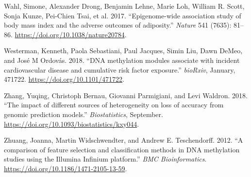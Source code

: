 \documentclass[]{article}
\begin{document}
\leavevmode\hypertarget{ref-Wahl2017}{}%
Wahl, Simone, Alexander Drong, Benjamin Lehne, Marie Loh, William R.
Scott, Sonja Kunze, Pei-Chien Tsai, et al. 2017. ``Epigenome-wide
association study of body mass index and the adverse outcomes of
adiposity.'' \emph{Nature} 541 (7635): 81--86.
\url{https://doi.org/10.1038/nature20784}.

\leavevmode\hypertarget{ref-Westerman2018}{}%
Westerman, Kenneth, Paola Sebastiani, Paul Jacques, Simin Liu, Dawn
DeMeo, and José M Ordovás. 2018. ``DNA methylation modules associate
with incident cardiovascular disease and cumulative risk factor
exposure.'' \emph{bioRxiv}, January, 471722.
\url{https://doi.org/10.1101/471722}.

\leavevmode\hypertarget{ref-Zhang2018}{}%
Zhang, Yuqing, Christoph Bernau, Giovanni Parmigiani, and Levi Waldron.
2018. ``The impact of different sources of heterogeneity on loss of
accuracy from genomic prediction models.'' \emph{Biostatistics},
September. \url{https://doi.org/10.1093/biostatistics/kxy044}.

\leavevmode\hypertarget{ref-Zhuang2012}{}%
Zhuang, Joanna, Martin Widschwendter, and Andrew E. Teschendorff. 2012.
``A comparison of feature selection and classification methods in DNA
methylation studies using the Illumina Infinium platform.'' \emph{BMC
Bioinformatics}. \url{https://doi.org/10.1186/1471-2105-13-59}.
\end{document}
